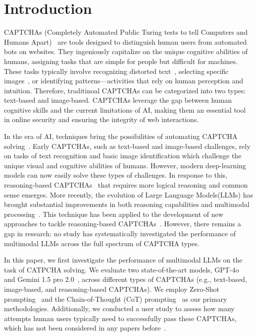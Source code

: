 \section{Introduction} 
CAPTCHAs (Completely Automated Public Turing tests to tell Computers and Humans Apart)~\cite{von2003captcha} are tools designed to distinguish human users from automated bots on websites. They ingeniously capitalize on the unique cognitive abilities of humans, assigning tasks that are simple for people but difficult for machines. These tasks typically involve recognizing distorted text~\cite{von2003captcha}, selecting specific images~\cite{gossweiler2009s,matthews2010scene}, or identifying patterns—activities that rely on human perception and intuition. Therefore, traditinoal CAPTCHAs can be categorized into two types: text-based and image-based. CAPTCHAs leverage the gap between human cognitive skills and the current limitations of AI, making them an essential tool in online security and ensuring the integrity of web interactions. 

In the era of AI, techniques bring the possibilities of automating CAPTCHA solving~\cite{ye2018yet,noury2020deep,teoh2024phishdecloaker}. Early CAPTCHAs, such as text-based and image-based challenges, rely on tasks of text recognition and basic image identification which challenge the unique visual and cognitive abilities of humans. However, modern deep-learning models can now easily solve these types of challenges. In response to this, reasoning-based CAPTCHAs~\cite{gao2021research} that requires more logical reasoning and common sense emerges. 
More recently, the evolution of Large Language Models(LLMs) has brought substantial improvements in both reasoning capabilities and multimodal processing~\cite{achiam2023gpt,team2023gemini}. This technique has been applied to the development of new approaches to tackle reasoning-based CAPTCHAs~\cite{deng2024oedipus}. However, there remains a gap in research: no study has systematically investigated the performance of multimodal LLMs across the full spectrum of CAPTCHA types.

In this paper, we first investigate the performance of multimodal LLMs on the task of CATPCHA solving. We evaluate two state-of-the-art models, GPT-4o~\cite{GPT4-o} and Gemini 1.5 pro 2.0~\cite{team2023gemini}, across different types of CAPTCHAs (e.g., text-based, image-based, and reasoning-based CAPTCHAs). We employ Zero-Shot prompting~\cite{pourpanah2022review} and the Chain-of-Thought (CoT) prompting~\cite{wei2022chain} as our primary methodologies. Additionally, we conducted a user study to assess how many attempts human users typically need to successfully pass these CAPTCHAs, which has not been considered in any papers before~\cite{deng2024oedipus,searles2023empirical}. 

